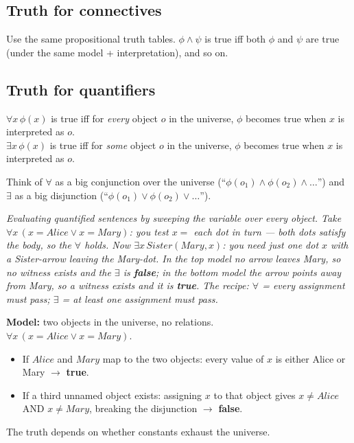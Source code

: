 \documentclass[11pt, a4paper]{article}
\begin{document}
\subsection{Truth for connectives}

Use the same propositional truth tables. $\phi \land \psi$ is true iff both $\phi$ and $\psi$ are true (under the same model + interpretation), and so on.

\subsection{Truth for quantifiers}

\begin{defbox}
$\forall x \, \phi(x)$ is true iff for \emph{every} object $o$ in the universe, $\phi$ becomes true when $x$ is interpreted as $o$.\\[0.3em]
$\exists x \, \phi(x)$ is true iff for \emph{some} object $o$ in the universe, $\phi$ becomes true when $x$ is interpreted as $o$.
\end{defbox}

Think of $\forall$ as a big conjunction over the universe (``$\phi(o_1) \land \phi(o_2) \land \dots$'') and $\exists$ as a big disjunction (``$\phi(o_1) \lor \phi(o_2) \lor \dots$'').

\begin{center}

\footnotesize\textit{Evaluating quantified sentences by sweeping the variable over every object. Take $\forall x\,(x = Alice \lor x = Mary)$: you test $x = $ each dot in turn — both dots satisfy the body, so the $\forall$ holds. Now $\exists x\,Sister(Mary, x)$: you need just one dot $x$ with a Sister-arrow \emph{leaving} the Mary-dot. In the top model no arrow leaves Mary, so no witness exists and the $\exists$ is \textbf{false}; in the bottom model the arrow points away from Mary, so a witness exists and it is \textbf{true}. The recipe: $\forall$ = every assignment must pass; $\exists$ = at least one assignment must pass.}
\end{center}

\begin{exbox}
\textbf{Model:} two objects in the universe, no relations.\\[0.3em]
$\forall x \, (x = Alice \lor x = Mary)$.
\begin{itemize}[leftmargin=*, itemsep=0pt, topsep=0pt]
  \item If $Alice$ and $Mary$ map to the two objects: every value of $x$ is either Alice or Mary $\to$ \textbf{true}.
  \item If a third unnamed object exists: assigning $x$ to that object gives $x \neq Alice$ AND $x \neq Mary$, breaking the disjunction $\to$ \textbf{false}.
\end{itemize}
The truth depends on whether constants exhaust the universe.
\end{exbox}
\end{document}
